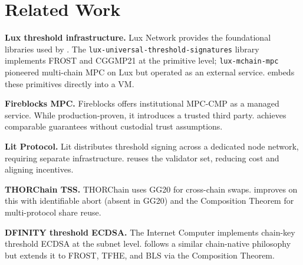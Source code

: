 \section{Related Work}

\label{sec:related}

\textbf{Lux threshold infrastructure.} Lux Network provides the foundational libraries used by \TChain{}. The \texttt{lux-universal-threshold-signatures} library \cite{lux-threshold-sigs} implements FROST and CGGMP21 at the primitive level; \texttt{lux-mchain-mpc} \cite{lux-mchain-mpc} pioneered multi-chain MPC on Lux but operated as an external service. \TChain{} embeds these primitives directly into a VM.

\textbf{Fireblocks MPC.} Fireblocks \cite{fireblocks2023mpc} offers institutional MPC-CMP as a managed service. While production-proven, it introduces a trusted third party. \TChain{} achieves comparable guarantees without custodial trust assumptions.

\textbf{Lit Protocol.} Lit \cite{lit2023threshold} distributes threshold signing across a dedicated node network, requiring separate infrastructure. \TChain{} reuses the validator set, reducing cost and aligning incentives.

\textbf{THORChain TSS.} THORChain \cite{thorchain2023tss} uses GG20 for cross-chain swaps. \TChain{} improves on this with identifiable abort (absent in GG20) and the Composition Theorem for multi-protocol share reuse.

\textbf{DFINITY threshold ECDSA.} The Internet Computer \cite{dfinity2022tecdsa} implements chain-key threshold ECDSA at the subnet level. \TChain{} follows a similar chain-native philosophy but extends it to FROST, TFHE, and BLS via the \LSS{} Composition Theorem.

